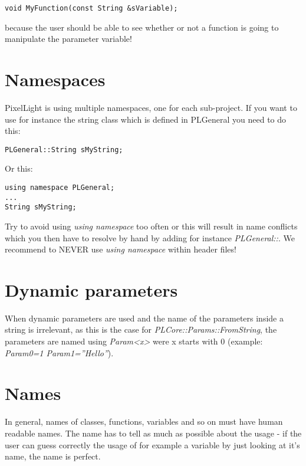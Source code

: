 \begin{lstlisting}[caption=Constant function pointer/reference parameter]
void MyFunction(const String &sVariable);
\end{lstlisting}

because the user should be able to see whether or not a function is going to manipulate the parameter variable!




\section{Namespaces}
PixelLight is using multiple namespaces, one for each sub-project. If you want to use for instance the string class which is defined in PLGeneral you need to do this:

\begin{lstlisting}[caption=Explicit namespace]
PLGeneral::String sMyString;
\end{lstlisting}

Or this:

\begin{lstlisting}[caption=Using namespace]
using namespace PLGeneral;
...
String sMyString;
\end{lstlisting}

Try to avoid using \emph{using namespace} too often or this will result in name conflicts which you then have to resolve by hand by adding for instance \emph{PLGeneral::}. We recommend to NEVER use \emph{using namespace} within header files!




\section{Dynamic parameters}
When dynamic parameters are used and the name of the parameters inside a string is irrelevant, as this is the case for \emph{PLCore::Params::FromString}, the parameters are named using \emph{Param<x>} were x starts with $0$ (example: \emph{Param0=1 Param1=''Hello''}).  




\section{Names}
In general, names of classes, functions, variables and so on must have human readable names. The name has to tell as much as possible about the usage - if the user can guess correctly the usage of for example a variable by just looking at it's name, the name is perfect.

